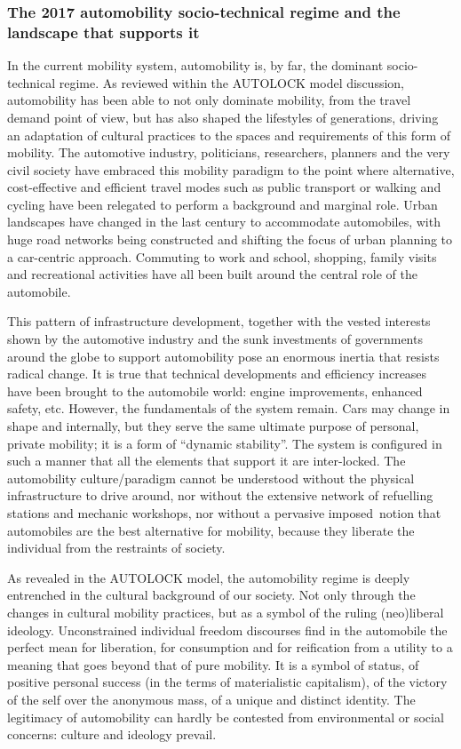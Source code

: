 \subsubsection*{The 2017 automobility socio-technical regime and the landscape that supports it}
In the current mobility system, automobility is, by far, the dominant socio-technical regime. As reviewed within the AUTOLOCK model discussion, automobility has been able to not only dominate mobility, from the travel demand point of view, but has also shaped the lifestyles of generations, driving an adaptation of cultural practices to the spaces and requirements of this form of mobility. The automotive industry, politicians, researchers, planners and the very civil society have embraced this mobility paradigm to the point where alternative, cost-effective and efficient travel modes such as public transport or walking and cycling have been relegated to perform a background and marginal role. Urban landscapes have changed in the last century to accommodate automobiles, with huge road networks being constructed and shifting the focus of urban planning to a car-centric approach. Commuting to work and school, shopping, family visits and recreational activities have all been built around the central role of the automobile.

This pattern of infrastructure development, together with the vested interests shown by the automotive industry and the sunk investments of governments around the globe to support automobility pose an enormous inertia that resists radical change. It is true that technical developments and efficiency increases have been brought to the automobile world: engine improvements, enhanced safety, etc. However, the fundamentals of the system remain. Cars may change in shape and internally, but they serve the same ultimate purpose of personal, private mobility; it is a form of ``dynamic stability''. The system is configured in such a manner that all the elements that support it are inter-locked. The automobility culture/paradigm cannot be understood without the physical infrastructure to drive around, nor without the extensive network of refuelling stations and mechanic workshops, nor without a pervasive imposed~notion that automobiles are the best alternative for mobility, because they liberate the individual from the restraints of society.

As revealed in the AUTOLOCK model, the automobility regime is deeply entrenched in the cultural background of our society. Not only through the changes in cultural mobility practices, but as a symbol of the ruling (neo)liberal ideology. Unconstrained individual freedom discourses find in the automobile the perfect mean for liberation, for consumption and for reification from a utility to a meaning that goes beyond that of pure mobility. It is a symbol of status, of positive personal success (in the terms of materialistic capitalism), of the victory of the self over the anonymous mass, of a unique and distinct identity. The legitimacy of automobility can hardly be contested from environmental or social concerns: culture and ideology prevail.

